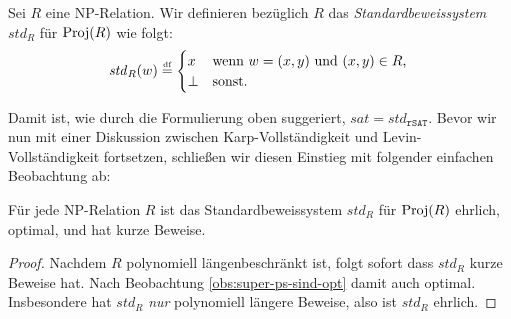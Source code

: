 \begin{definition}
    Sei $R$ eine NP-Relation. Wir definieren bezüglich $R$ das \emph{Standardbeweissystem} $\mathit{std}_R$ für $\operatorname{Proj}(R)$ wie folgt:
    \[ \mathit{std}_R(w) \stackrel{\text{\smash{\tiny df}}}{=} \begin{cases} x & \text{wenn $w=(x,y)$ und $(x,y)\in R$,}\\
    \bot & \text{sonst}.\end{cases} \qedhere \] 
\end{definition}
Damit ist, wie durch die Formulierung oben suggeriert, $\mathit{sat}=\mathit{std}_{\mathtt{rSAT}}$.
Bevor wir nun mit einer Diskussion zwischen Karp-Vollständigkeit und Levin-Vollständigkeit fortsetzen, schließen wir diesen Einstieg mit folgender einfachen Beobachtung ab:
\begin{observation}\label{obs:spps-honest}
    Für jede NP-Relation $R$ ist das Standardbeweissystem $\mathit{std}_R$ für $\operatorname{Proj}(R)$ ehrlich, optimal, und hat kurze Beweise.
\end{observation}
\begin{proof}
    Nachdem $R$ polynomiell längenbeschränkt ist, folgt sofort dass $\mathit{std}_R$ kurze Beweise hat. 
    Nach Beobachtung \ref{obs:super-ps-sind-opt} damit auch optimal.
    Insbesondere hat $\mathit{std}_R$ \emph{nur} polynomiell längere Beweise, also ist $\mathit{std}_R$ ehrlich.
\end{proof}

